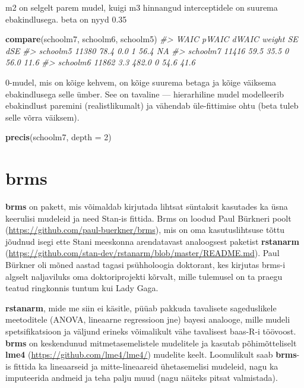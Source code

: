 \documentclass[]{book}
\newenvironment{Shaded}{\begin{snugshade}}{\end{snugshade}}
\newcommand{\CommentTok}[1]{\textcolor[rgb]{0.56,0.35,0.01}{\textit{#1}}}
\newcommand{\DataTypeTok}[1]{\textcolor[rgb]{0.13,0.29,0.53}{#1}}
\newcommand{\DecValTok}[1]{\textcolor[rgb]{0.00,0.00,0.81}{#1}}
\newcommand{\KeywordTok}[1]{\textcolor[rgb]{0.13,0.29,0.53}{\textbf{#1}}}
\newcommand{\NormalTok}[1]{#1}
\begin{document}
m2 on selgelt parem mudel, kuigi m3 hinnangud interceptidele on suurema ebakindlusega. beta on nyyd 0.35

\begin{Shaded}
\begin{Highlighting}[]
\KeywordTok{compare}\NormalTok{(schoolm7, schoolm6, schoolm5)}
\CommentTok{#>           WAIC pWAIC dWAIC weight   SE  dSE}
\CommentTok{#> schoolm5 11380  78.4   0.0      1 56.4   NA}
\CommentTok{#> schoolm7 11416  59.5  35.5      0 56.0 11.6}
\CommentTok{#> schoolm6 11862   3.3 482.0      0 54.6 41.6}
\end{Highlighting}
\end{Shaded}

0-mudel, mis on kõige kehvem, on kõige suurema betaga ja kõige väiksema ebakindlusega selle ümber. See on tavaline --- hierarhiline mudel modelleerib ebakindlust paremini (realistlikumalt) ja vähendab üle-fittimise ohtu (beta tuleb selle võrra väiksem).

\begin{Shaded}
\begin{Highlighting}[]
\KeywordTok{precis}\NormalTok{(schoolm7, }\DataTypeTok{depth =} \DecValTok{2}\NormalTok{)}
\end{Highlighting}
\end{Shaded}

\hypertarget{brms}{%
\chapter{brms}\label{brms}}

\textbf{brms} on pakett, mis võimaldab kirjutada lihtsat süntaksit kasutades ka üsna keerulisi mudeleid ja need Stan-is fittida. Brms on loodud Paul Bürkneri poolt (\url{https://github.com/paul-buerkner/brms}), mis on oma kasutuslihtsuse tõttu jõudnud isegi ette Stani meeskonna arendatavast analoogsest paketist \textbf{rstanarm} (\url{https://github.com/stan-dev/rstanarm/blob/master/README.md}). Paul Bürkner oli mõned aastad tagasi psühholoogia doktorant, kes kirjutas brms-i algselt naljaviluks oma doktoriprojekti kõrvalt, mille tulemusel on ta praegu teatud ringkonnis tuntum kui Lady Gaga.

\textbf{rstanarm}, mide me siin ei käsitle, püüab pakkuda tavalisete sageduslikele meetoditele (ANOVA, lineaarne regressioon jne) bayesi analooge, mille mudeli spetsifikatsioon ja väljund erineks võimalikult vähe tavalisest baas-R-i töövoost. \textbf{brms} on keskendunud mitmetasemelistele mudelitele ja kasutab põhimõtteliselt \textbf{lme4} (\url{https://github.com/lme4/lme4/}) mudelite keelt. Loomulikult saab \textbf{brms}-is fittida ka lineaarseid ja mitte-lineaareid ühetasemelisi mudeleid, nagu ka imputeerida andmeid ja teha palju muud (nagu näiteks pitsat valmistada).
\end{document}
